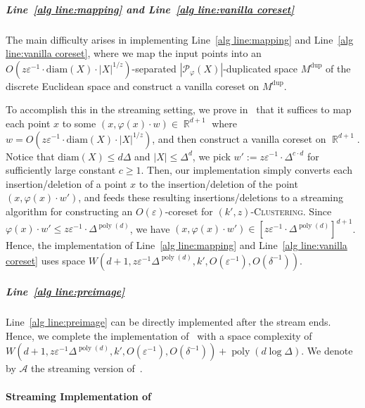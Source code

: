 \documentclass[letterpaper,11pt]{article}
\theoremstyle{plain}
\theoremstyle{definition}
\theoremstyle{remark}
\DeclareMathOperator{\R}{\mathbb{R}}
\DeclareMathOperator{\poly}{poly}
\newcommand{\diam}{\mathrm{diam}}
\newcommand{\dup}{\mathrm{dup}}
\newcommand{\eps}{\varepsilon}
\renewcommand{\phi}{\varphi}
\newcommand{\calA}{\mathcal{A}}
\newcommand{\calP}{\mathcal{P}}
\newcommand{\ProblemName}[1]{\textsc{#1}}
\newcommand{\tzC}[1]{\ProblemName{$(#1,z)$-Clustering}\xspace}
\begin{document}
\subparagraph{Line~\ref{alg line:mapping} and Line~\ref{alg line:vanilla coreset}}
The main difficulty arises in implementing Line~\ref{alg line:mapping} and Line~\ref{alg line:vanilla coreset}, where we map the input points into an $O(z\eps^{-1}\cdot \diam(X)\cdot |X|^{1/z})$-separated $|\calP_\phi(X)|$-duplicated space $M^\dup$ of the discrete Euclidean space and construct a vanilla coreset on $M^\dup$.

To accomplish this in the streaming setting, we prove in~ that it suffices to map each point $x$ to some $(x,\phi(x)\cdot w)\in \R^{d+1}$ where $w = O(z\eps^{-1}\cdot \diam(X)\cdot |X|^{1/z})$, and then construct a vanilla coreset on $\R^{d+1}$.
Notice that $\diam(X)\le d\Delta$ and $|X|\le \Delta^d$, we pick $w':= z\eps^{-1}\cdot \Delta^{c\cdot d}$ for sufficiently large constant $c\ge 1$. 
Then, our implementation simply converts each insertion/deletion of a point $x$ to the insertion/deletion of the point $(x,\phi(x)\cdot w')$, and feeds these resulting insertions/deletions to a streaming algorithm for constructing an $O(\eps)$-coreset for \tzC{k'}.
Since $\phi(x)\cdot w' \le z\eps^{-1}\cdot \Delta^{\poly(d)}$, we have $(x,\phi(x)\cdot w')\in [z\eps^{-1}\cdot \Delta^{\poly(d)}]^{d+1}$. Hence, the implementation of Line~\ref{alg line:mapping} and Line~\ref{alg line:vanilla coreset} uses space $W\left(d+1, z\eps^{-1}\Delta^{\poly(d)}, k', O(\eps^{-1}),O(\delta^{-1})\right)$.

\subparagraph{Line~\ref{alg line:preimage}} 
Line~\ref{alg line:preimage} can be directly implemented after the stream ends. Hence, we complete the implementation of~ with a space complexity of $W(d+1,z\eps^{-1}\Delta^{\poly(d)},k',O(\eps^{-1}), O(\delta^{-1})) + \poly(d\log\Delta)$. We denote by $\calA$ the streaming version of~.

\paragraph{Streaming Implementation of~} 
\end{document}
